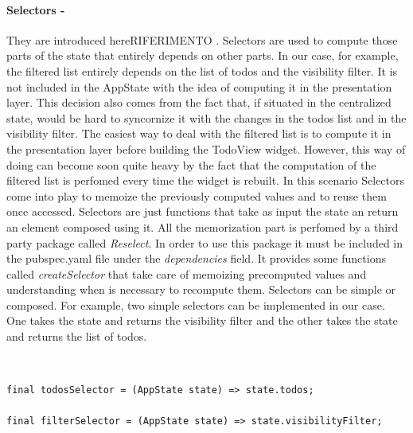 \paragraph{Selectors - }
\label{subpar:todo_app_bloc_core_state}
They are introduced hereRIFERIMENTO . Selectors are used to compute those parts of the state that entirely depends on other parts. In our case, for example, the filtered list entirely depends on the list of todos and the visibility filter. It is not included in the AppState with the idea of computing it in the presentation layer. This decision also comes from the fact that, if situated in the centralized state, would be hard to syncornize it with the changes in the todos list and in the visibility filter. The easiest way to deal with the filtered list is to compute it in the presentation layer before building the TodoView widget. However, this way of doing can become soon quite heavy by the fact that the computation of the filtered list is perfomed every time the widget is rebuilt. In this scenario Selectors come into play to memoize the previously computed values and to reuse them once accessed. Selectors are just functions that take as input the state an return an element composed using it. All the memorization part is perfomed by a third party package called \textit{Reselect}. In order to use this package it must be included in the pubspec.yaml file under the \textit{dependencies} field. It provides some functions called \textit{createSelector} that take care of memoizing precomputed values and understanding when is necessary to recompute them. Selectors can be simple or composed. For example, two simple selectors can be implemented in our case. One takes the state and returns the visibility filter and the other takes the state and returns the list of todos.
\begin{code}
\mbox{}\\
 \mbox{}
		\label{code:2.63}
\begin{verbatim}
final todosSelector = (AppState state) => state.todos;

final filterSelector = (AppState state) => state.visibilityFilter;
\end{verbatim}
\mbox{}
\end{code}

